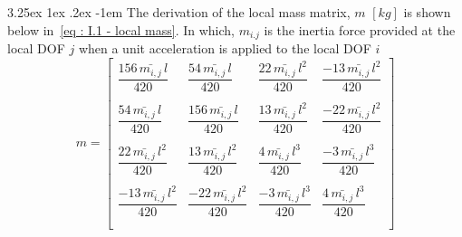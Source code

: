 \documentclass[11pt,a4paper,titlepage]{report}
\makeatletter
\renewcommand\paragraph{\@startsection{paragraph}{5}{\z@}%
  {3.25ex \@plus1ex \@minus.2ex}%
  {-1em}%
  {\normalfont\normalsize\bfseries}}
\makeatother
\begin{document}
\paragraph{}The derivation of the local mass matrix, $m$ $[kg]$ is shown below in \textsc{}\,\eqref{eq : I.1 - local mass}. In which, $m_{i.j}$ is the inertia force provided at the local DOF $j$ when a unit acceleration is applied to the local DOF $i$
\begin{equation}
m=
\left[
\begin{matrix}
\dfrac{156\,\bar{m_{i,j}}\,l}{420} & \dfrac{54\,\bar{m_{i,j}}\,l}{420} & \dfrac{22\,\bar{m_{i,j}}\,l^2}{420} & \dfrac{-13\,\bar{m_{i,j}}\,l^2}{420}\\ \\
\dfrac{54\,\bar{m_{i,j}}\,l}{420} & \dfrac{156\,\bar{m_{i,j}}\,l}{420} & \dfrac{13\,\bar{m_{i,j}}\,l^2}{420} & \dfrac{-22\,\bar{m_{i,j}}\,l^2}{420}\\ \\
\dfrac{22\,\bar{m_{i,j}}\,l^2}{420} & \dfrac{13\,\bar{m_{i,j}}\,l^2}{420} & \dfrac{4\,\bar{m_{i,j}}\,l^3}{420} & \dfrac{-3\,\bar{m_{i,j}}\,l^3}{420}\\ \\
\dfrac{-13\,\bar{m_{i,j}}\,l^2}{420} & \dfrac{-22\,\bar{m_{i,j}}\,l^2}{420} & \dfrac{-3\,\bar{m_{i,j}}\,l^3}{420} & \dfrac{4\,\bar{m_{i,j}}\,l^3}{420}\\ \\
\end{matrix}
\right]
\label{eq : I.1 - local mass}
\end{equation}
\end{document}

